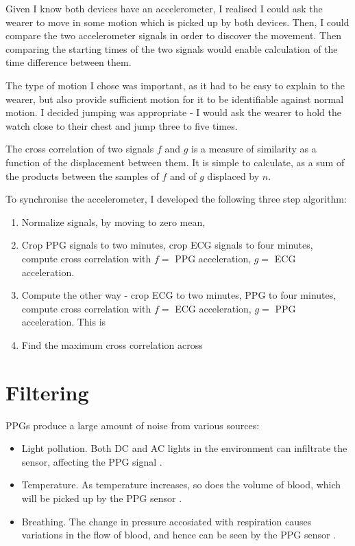 \documentclass[12pt,a4paper,twoside,openright]{report}
\begin{document}
Given I know both devices have an accelerometer, I realised I could ask the
wearer to move in some motion which is picked up by both devices. Then, I
could compare the two accelerometer signals in order to discover the
movement. Then comparing the starting times of the two signals would enable
calculation of the time difference between them.

The type of motion I chose was important, as it had to be easy to explain to
the wearer, but also provide sufficient motion for it to be identifiable
against normal motion. I decided jumping was appropriate -
I would ask the wearer to hold the watch close to their chest and jump three
to five times.

The cross correlation of two signals \(f\) and \(g\) is a measure of
similarity as a function of the displacement between them. It is simple to
calculate, as a sum of the products between the samples of \(f\) and of \(g\)
displaced by \(n\).

To synchronise the accelerometer, I developed the following three step 
algorithm:
\begin{enumerate}
	\item Normalize signals, by moving to zero mean, 

	\item Crop PPG signals to two minutes, crop ECG signals to four
		minutes, compute cross correlation with \(f=\) PPG
		acceleration, \(g=\) ECG acceleration.

	\item Compute the other way - crop ECG to two minutes, PPG to four
		minutes, compute cross correlation with \(f=\) ECG
		acceleration, \(g=\) PPG acceleration. This is 

	\item Find the maximum cross correlation across 

\end{enumerate}


\section{Filtering}

PPGs produce a large amount of noise from various sources:
\begin{itemize}
	\item Light pollution. Both DC and AC lights in the environment can
		infiltrate the sensor, affecting the PPG signal \cite{kim15}.
	\item Temperature. As temperature increases, so does the volume of
		blood, which will be picked up by the PPG sensor 
		\cite{shin16}.
	\item Breathing. The change in pressure accosiated with respiration
		causes variations in the flow of blood, and hence can be seen
		by the PPG sensor \cite{allen02}.
\end{itemize}
\end{document}
